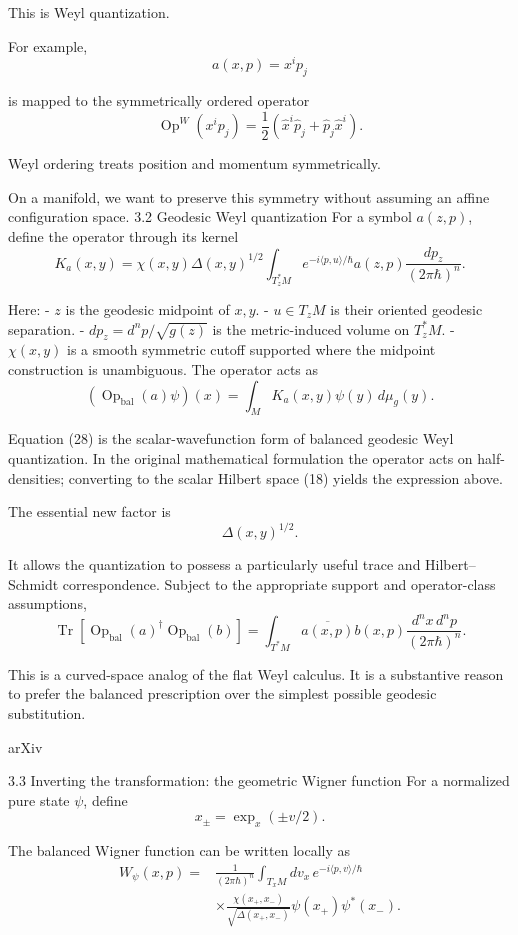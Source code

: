 This is Weyl quantization.

For example,
\[
a(x,p)=x^ip_j
\]

is mapped to the symmetrically ordered operator
\[
\operatorname{Op}^{W}(x^ip_j)
=
\frac12(\widehat x^i\widehat p_j+
\widehat p_j\widehat x^i).
\tag{27}
\]

Weyl ordering treats position and momentum symmetrically.

On a manifold, we want to preserve this symmetry without assuming an affine configuration space.
3.2 Geodesic Weyl quantization
For a symbol \(a(z,p)\), define the operator through its kernel
\[
\boxed{
K_a(x,y)=
\chi(x,y)\Delta(x,y)^{1/2}
\int_{T_z^*M}
e^{-i\langle p,u\rangle/\hbar}
a(z,p)
\frac{dp_z}{(2\pi\hbar)^n}.
}
\tag{28}
\]

Here:
- \(z\) is the geodesic midpoint of \(x,y\).
- \(u\in T_zM\) is their oriented geodesic separation.
- \(dp_z=d^np/\sqrt{g(z)}\) is the metric-induced volume on \(T_z^*M\).
- \(\chi(x,y)\) is a smooth symmetric cutoff supported where the midpoint construction is unambiguous.
The operator acts as
\[
(\operatorname{Op}_{\mathrm{bal}}(a)\psi)(x)
=
\int_M K_a(x,y)\psi(y)\,d\mu_g(y).
\tag{29}
\]

Equation (28) is the scalar-wavefunction form of balanced geodesic Weyl quantization. In the original mathematical formulation the operator acts on half-densities; converting to the scalar Hilbert space (18) yields the expression above.

The essential new factor is
\[
\Delta(x,y)^{1/2}.
\]

It allows the quantization to possess a particularly useful trace and Hilbert–Schmidt correspondence. Subject to the appropriate support and operator-class assumptions,
\[
\operatorname{Tr}
\left[
\operatorname{Op}_{\mathrm{bal}}(a)^\dagger
\operatorname{Op}_{\mathrm{bal}}(b)
\right]
=
\int_{T^*M}
\overline{a(x,p)}b(x,p)
\frac{d^nx\,d^np}{(2\pi\hbar)^n}.
\tag{30}
\]

This is a curved-space analog of the flat Weyl calculus. It is a substantive reason to prefer the balanced prescription over the simplest possible geodesic substitution. 

arXiv



3.3 Inverting the transformation: the geometric Wigner function
For a normalized pure state \(\psi\), define
\[
x_\pm=\exp_x(\pm v/2).
\]

The balanced Wigner function can be written locally as
\[
\boxed{
\begin{aligned}
W_\psi(x,p)
={}&
\frac1{(2\pi\hbar)^n}
\int_{T_xM}dv_x\,
e^{-i\langle p,v\rangle/\hbar}\\
&\times
\frac{\chi(x_+,x_-)}
{\sqrt{\Delta(x_+,x_-)}}
\psi(x_+)\psi^*(x_-).
\end{aligned}
}
\tag{31}
\]

